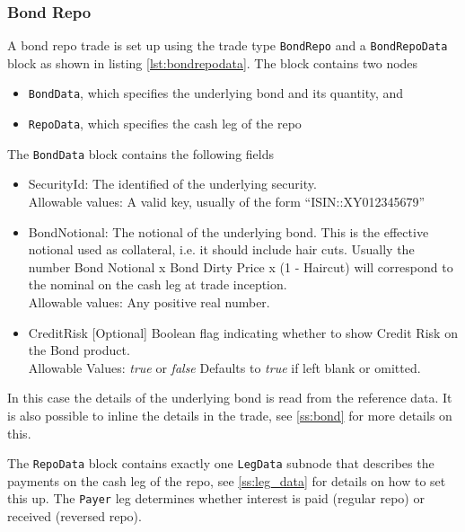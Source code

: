 \subsubsection{Bond Repo}

A bond repo trade is set up using the trade type \verb+BondRepo+ and a \verb+BondRepoData+ block as shown in listing
\ref{lst:bondrepodata}. The block contains two nodes

\begin{itemize}
\item \verb+BondData+, which specifies the underlying bond and its quantity, and
\item \verb+RepoData+, which specifies the cash leg of the repo
\end{itemize}

The \verb+BondData+ block contains the following fields

\begin{itemize}
\item SecurityId: The identified of the underlying security.\\
  Allowable values: A valid key, usually of the form ``ISIN::XY012345679''
\item BondNotional: The notional of the underlying bond. This is the effective notional used as collateral, i.e. it
  should include hair cuts. Usually the number Bond Notional x Bond Dirty Price x (1 - Haircut) will correspond to the
  nominal on the cash leg at trade inception.\\
  Allowable values: Any positive real number.
    \item CreditRisk [Optional] Boolean flag indicating whether to show Credit Risk on the Bond product. \\
      Allowable Values: \emph{true} or \emph{false} Defaults to \emph{true} if left blank or omitted.    
\end{itemize}

In this case the details of the underlying bond is read from the reference data. It is also possible to inline the
details in the trade, see \ref{ss:bond} for more details on this.

The \verb+RepoData+ block contains exactly one \verb+LegData+ subnode that describes the payments on the cash leg of the
repo, see \ref{ss:leg_data} for details on how to set this up. The \verb+Payer+ leg determines whether interest is paid
(regular repo) or received (reversed repo).

